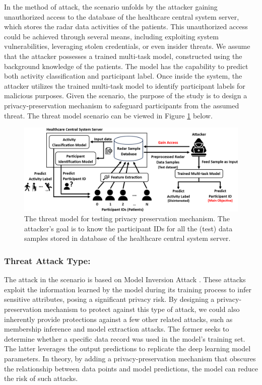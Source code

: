 \documentclass{l4proj}
\begin{document}
In the method of attack, the scenario unfolds by the attacker gaining unauthorized access to the database of the healthcare central system server, which stores the radar data activities of the patients. This unauthorized access could be achieved through several means, including exploiting system vulnerabilities, leveraging stolen credentials, or even insider threats. We assume that the attacker possesses a trained multi-task model, constructed using the background knowledge of the patients. The model has the capability to predict both activity classification and participant label. Once inside the system, the attacker utilizes the trained multi-task model to identify participant labels for malicious purposes. Given the scenario, the purpose of the study is to design a privacy-preservation mechanism to safeguard participants from the assumed threat. The threat model scenario can be viewed in Figure \ref{fig:threat-model} below.

\begin{figure}[h]
    \centering
    \includegraphics[width=0.9\linewidth]{images/threat-model.png}
    \caption{The threat model for testing privacy preservation mechanism. The attacker's goal is to know the participant IDs for all the (test) data samples stored in database of the healthcare central system server.}
    \label{fig:threat-model}
\end{figure}

\subsubsection{Threat Attack Type:}
The attack in the scenario is based on Model Inversion Attack \citep{model_inversion_attack_analysis}. These attacks exploit the information learned by the model during its training process to infer sensitive attributes, posing a significant privacy risk. By designing a privacy-preservation mechanism to protect against this type of attack, we could also inherently provide protections against a few other related attacks, such as membership inference and model extraction attacks. The former seeks to determine whether a specific data record was used in the model's training set. The latter leverages the output predictions to replicate the deep learning model parameters. In theory, by adding a privacy-preservation mechanism that obscures the relationship between data points and model predictions, the model can reduce the risk of such attacks.
\end{document}
